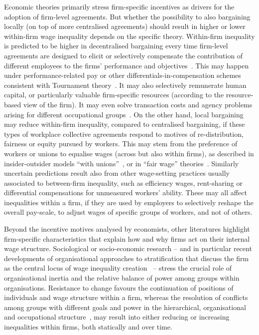 \documentclass[12pt]{article}
\begin{document}
Economic theories primarily stress firm-specific incentives as drivers for the adoption of firm-level agreements. But whether the possibility to also bargaining locally (on top of more centralised agreements) should result in higher or lower within-firm wage inequality depends on the specific theory.
Within-firm inequality is predicted to be higher in decentralised bargaining every time firm-level agreements are designed to elicit or selectively compensate the contribution of different employees to the firms' performance and objectives~\citep{bayo2013diffusion}.
This may happen under performance-related pay or other differentials-in-compensation schemes consistent with Tournament theory~\citep{lazear.1979}. It may also selectively remunerate human capital, or particularly valuable firm-specific resources (according to the resource-based view of the firm). It may even solve transaction costs and agency problems arising for different occupational groups~\citep{eisenhardt1989agency,o1998structure}. On the other hand, local bargaining may reduce within-firm inequality, compared to centralised bargaining, if these types of workplace collective agreements respond to motives of re-distribution, fairness or equity pursued by workers. This may stem from the preference of workers or unions to equalise wages (across but also within firms), as described in insider-outsider models “with unions”~\citep{lindbeck1986wage,lindbeck2001insiders}, or in “fair wage” theories~\citep{akerlof.1984}. 
Similarly uncertain predictions result also from other wage-setting practices usually associated to between-firm inequality, such as efficiency wages, rent-sharing or differential compensations for unmeasured workers' ability. These may all affect inequalities within a firm, if they are used by employers to selectively reshape the overall pay-scale, to adjust wages of specific groups of workers, and not of others.

Beyond the incentive motives analysed by economists, other literatures highlight  firm-specific characteristics that explain how and why firms act on their internal wage structure. Sociological or socio-economic research -- and in particular recent developments of organisational approaches to stratification that discuss the firm as the central locus of wage inequality creation~\citep{stainback2010,cobb2016} -- stress the crucial role of organisational inertia and the relative balance of power among groups within organisations. Resistance to change favours the continuation of positions of individuals and wage structure within a firm, whereas the resolution of conflicts among groups with different goals and power in the hierarchical, organisational and occupational structure~\citep{blau1967american, goldthorpe1972occupational, wright1980class, erikson2002intergenerational}, may result into either reducing or increasing inequalities within firms, both statically and over time. 
\end{document}
